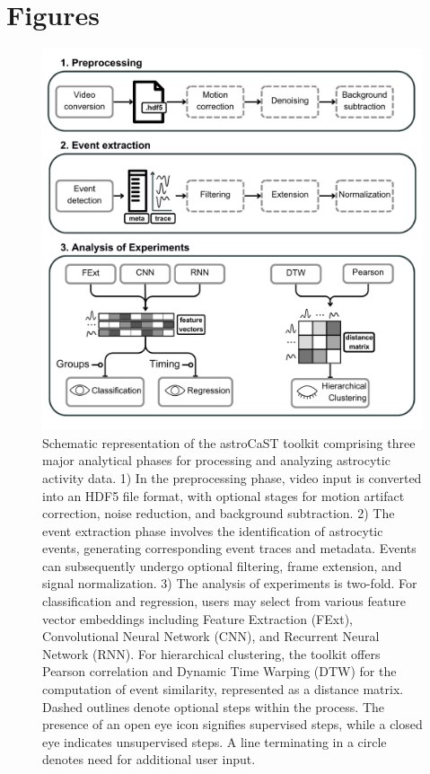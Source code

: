\documentclass[utf8]{FrontiersinHarvard}
\begin{document}
    \section*{Figures}
    \begin{figure}[!htb]
        \begin{center}
            \includegraphics[width=\linewidth]{figures/1.png}
        \end{center}
        \caption{Schematic representation of the astroCaST toolkit comprising three major analytical phases for processing and analyzing astrocytic activity data. 1) In the preprocessing phase, video input is converted into an HDF5 file format, with optional stages for motion artifact correction, noise reduction, and background subtraction. 2) The event extraction phase involves the identification of astrocytic events, generating corresponding event traces and metadata. Events can subsequently undergo optional filtering, frame extension, and signal normalization. 3) The analysis of experiments is two-fold. For classification and regression, users may select from various feature vector embeddings including Feature Extraction (FExt), Convolutional Neural Network (CNN), and Recurrent Neural Network (RNN). For hierarchical clustering, the toolkit offers Pearson correlation and Dynamic Time Warping (DTW) for the computation of event similarity, represented as a distance matrix. Dashed outlines denote optional steps within the process. The presence of an open eye icon signifies supervised steps, while a closed eye indicates unsupervised steps. A line terminating in a circle denotes need for additional user input.}\label{fig:1}
    \end{figure}
\end{document}
